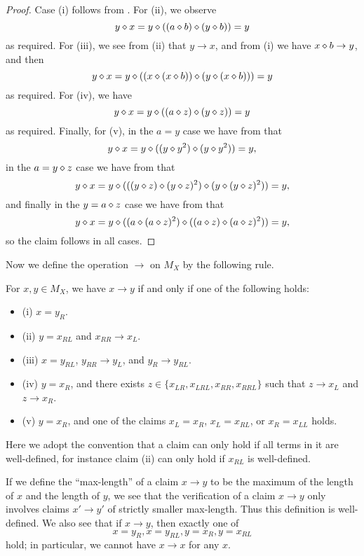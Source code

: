\begin{proof}  Case (i) follows from .  For (ii), we observe
$$ y \diamond x = y \diamond ((a \diamond b) \diamond (y \diamond b)) = y$$
as required.  For (iii), we see from (ii) that $y \to x$, and from (i) we have $x \diamond b \to y$, and then
$$ y \diamond x = y \diamond ((x \diamond (x \diamond b)) \diamond (y \diamond (x \diamond b))) = y$$
as required.  For (iv), we have
$$ y \diamond x = y \diamond ((a \diamond z) \diamond (y \diamond z)) = y$$
as required.  Finally, for (v), in the $a=y$ case we have from  that
$$ y \diamond x = y \diamond ((y \diamond y^2) \diamond (y \diamond y^2)) = y,$$
in the $a = y \diamond z$ case we have from  that
$$ y \diamond x = y \diamond (((y \diamond z) \diamond (y \diamond z)^2) \diamond (y \diamond (y \diamond z)^2)) = y,$$
and finally in the $y = a \diamond z$ case we have from  that
$$ y \diamond x = y \diamond ( (a \diamond (a \diamond z)^2) \diamond ((a \diamond z) \diamond (a \diamond z)^2)) = y,$$
so the claim follows in all cases.
\end{proof}

Now we define the operation $\to$ on $M_X$ by the following rule.

\begin{definition}\label{free-relate} For $x,y \in M_X$, we have $x \to y$ if and only if one of the following holds:
\begin{itemize}
\item (i) $x = y_R$.
\item (ii) $y = x_{RL}$ and $x_{RR} \to x_L$.
\item (iii) $x = y_{RL}$, $y_{RR} \to y_L$, and $y_R \to y_{RL}$.
\item (iv) $y = x_R$, and there exists $z \in \{ x_{LR}, x_{LRL}, x_{RR}, x_{RRL} \}$ such that $z \to x_L$ and $z \to x_R$.
\item (v)  $y = x_R$, and one of the claims $x_L = x_R$, $x_L = x_{RL}$, or $x_R = x_{LL}$ holds.
\end{itemize}
Here we adopt the convention that a claim can only hold if all terms in it are well-defined, for instance claim (ii) can only hold if $x_{RL}$ is well-defined.
\end{definition}

If we define the ``max-length'' of a claim $x \to y$ to be the maximum of the length of $x$ and the length of $y$, we see that the verification of a claim $x \to y$ only involves claims $x' \to y'$ of strictly smaller max-length.  Thus this definition is well-defined.  We also see that if $x \to y$, then exactly one of
\begin{equation}\label{one}
  x=y_R, x=y_{RL}, y = x_R, y=x_{RL}
\end{equation}
hold; in particular, we cannot have $x \to x$ for any $x$.

